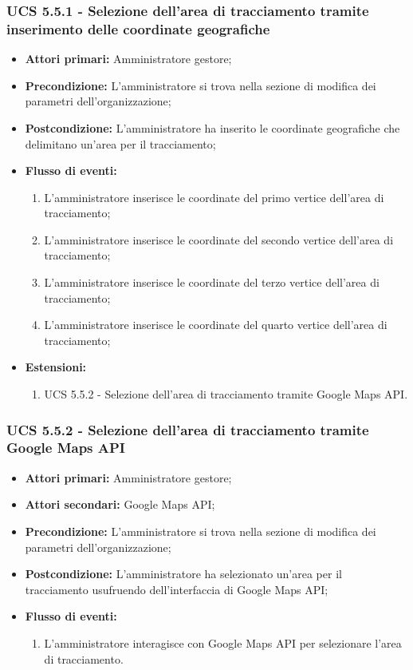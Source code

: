 \subsubsection{UCS 5.5.1 - Selezione dell'area di tracciamento tramite inserimento delle coordinate geografiche}%
\begin{itemize}
\item \textbf{Attori primari:} Amministratore gestore;
\item \textbf{Precondizione:} L'amministratore si trova nella sezione di modifica dei parametri dell'organizzazione;
\item \textbf{Postcondizione:} L'amministratore ha inserito le coordinate geografiche che delimitano un'area per il tracciamento;
\item \textbf{Flusso di eventi:}
\begin{enumerate}
    \item L'amministratore inserisce le coordinate del primo vertice dell'area di tracciamento;
    \item L'amministratore inserisce le coordinate del secondo vertice dell'area di tracciamento;
    \item L'amministratore inserisce le coordinate del terzo vertice dell'area di tracciamento;
    \item L'amministratore inserisce le coordinate del quarto vertice dell'area di tracciamento;
\end{enumerate}
\item \textbf{Estensioni:}
\begin{enumerate}
    \item UCS 5.5.2 - Selezione dell'area di tracciamento tramite Google Maps API.
\end{enumerate}
\end{itemize}

\subsubsection{UCS 5.5.2 - Selezione dell'area di tracciamento tramite Google Maps API}%
\begin{itemize}
\item \textbf{Attori primari:} Amministratore gestore;
\item \textbf{Attori secondari:} Google Maps API;
\item \textbf{Precondizione:} L'amministratore si trova nella sezione di modifica dei parametri dell'organizzazione;
\item \textbf{Postcondizione:} L'amministratore ha selezionato un'area per il tracciamento usufruendo dell'interfaccia di Google Maps API;
\item \textbf{Flusso di eventi:}
\begin{enumerate}
    \item L'amministratore interagisce con Google Maps API per selezionare l'area di tracciamento.
\end{enumerate}
\end{itemize}